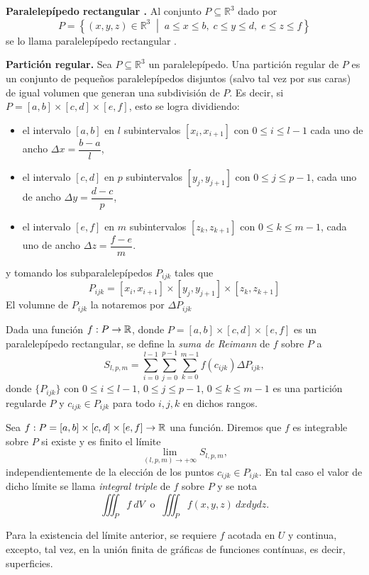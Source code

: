 \begin{definition} \textbf{Paralelepípedo rectangular .}  Al conjunto $P  \subseteq  \mathbb{R}^3$ dado por
\[
P = \left\{ (x, y, z) \in \mathbb{R}^3 \;\middle|\; a \leq x \leq b,\; c \leq y \leq d,\; e \leq z \leq f \right\}
\] 
se lo llama paralelepípedo rectangular . 
\end{definition}


\begin{definition} \textbf{Partici\'on regular.} 	Sea \( P  \subseteq  \mathbb{R}^3 \) un paralelepípedo.  Una partición regular de $P$ es un conjunto de pequeños paralelepípedos disjuntos (salvo tal vez por sus caras)  de igual volumen que  generan una subdivisi\'on de $P$.  Es decir, si $P = [a, b] \times [c, d] \times [e, f]$,  esto se logra dividiendo:

\begin{itemize}
    \item el intervalo \( [a, b] \) en \( l \) subintervalos \( [x_i, x_{i+1}] \)  con $0 \leq  i \leq l-1$ cada uno de ancho \( \Delta x=\dfrac{b-a}{l} \),
    \item el intervalo \( [c, d] \) en \( p \) subintervalos \( [y_j, y_{j+1}] \)  con $0 \leq  j \leq p-1$, cada uno de ancho \( \Delta y=\dfrac{d-c}{p} \),
    \item el intervalo \( [e, f] \) en \( m \) subintervalos \( [z_k, z_{k+1}] \)  con $0 \leq  k \leq m-1$, cada uno de ancho \( \Delta z=\dfrac{f-e}{m} \).
\end{itemize}
y tomando los subparalelepípedos $P_{ijk}$ tales que
	\[
	P_{ijk} = [x_i, x_{i+1}] \times [y_j, y_{j+1}] \times [z_k, z_{k+1}]
	\]  El volumne de $ P_{ijk}$ la notaremos por $\Delta P_{ijk}$ 
\end{definition}


%


\begin{definition}
Dada una funci\'on $f:P\to\mathbb{R}$, donde  $P = [a, b] \times [c, d] \times [e, f]$ es un paralelep\'ipedo rectangular,  se define la \emph{suma de Reimann}  de $f$ sobre $P$ a
\[
    S_{l,p,m}=\sum_{i=0}^{l-1}\sum_{j=0}^{p-1}\sum_{k=0}^{m-1}f(c_{ijk})\Delta P_{ijk},
\]  
donde \(\{ P_{ijk}\}\) con \(0 \leq i \leq l-1\), \(0 \leq j \leq p-1\), \(0 \leq k \leq m-1\) es una partición regularde $P$ y  $c_{ijk}\in P_{ijk}$  para todo \(i, j, k\) en dichos rangos. 
\end{definition}

\begin{definition} 
Sea $f: P=[a,b]\times[c,d]\times[e,f] \to\mathbb{R}$ una funci\'on.    Diremos que $f$ es integrable sobre $P$ si existe y es finito el  l\'imite $$\lim_{(l,p,m)\to +\infty} S_{l,p,m}, $$ independientemente de la elección de los puntos \(c_{ijk} \in P_{ijk}\). En tal caso  el valor de dicho l\'imite  se llama \emph{integral triple} de $f$ sobre $P$ y se nota 
    \[
          \iiint_P f\:dV  \: \mbox{ o } \:  \iiint_P f(x,y,z)\:dxdydz.
    \]
\end{definition}






\begin{obs}
Para la existencia del límite anterior, se requiere $f$ acotada en $U$ y continua, excepto, tal vez, en la unión finita de gráficas de funciones 
contínuas, es decir, superficies.
\end{obs}
